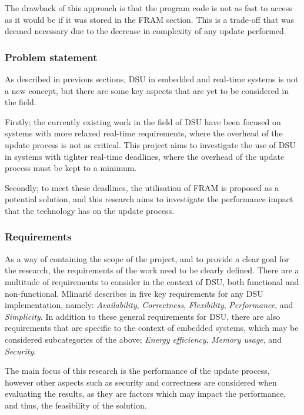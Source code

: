 The drawback of this approach is that the program code is not as fast to access as it would be if it was stored in the FRAM section. This is a trade-off that was deemed necessary due to the decrease in complexity of any update performed.  

\subsubsection*{Problem statement}
As described in previous sections, DSU in embedded and real-time systems is not a new concept, but there are some key aspects that are yet to be considered in the field. 

Firstly; the currently existing work in the field of DSU have been focused on systems with more relaxed real-time requirements, where the overhead of the update process is not as critical. This project aims to investigate the use of DSU in systems with tighter real-time deadlines, where the overhead of the update process must be kept to a minimum.

Secondly; to meet these deadlines, the utilisation of FRAM is proposed as a potential solution, and this research aims to investigate the performance impact that the technology has on the update process.  

\subsubsection*{Requirements}
As a way of containing the scope of the project, and to provide a clear goal for the research, the requirements of the work need to be clearly defined. There are a multitude of requirements to consider in the context of DSU, both functional and non-functional. Mlinarić describes in \cite{dsuChallenges} five key requirements for any DSU implementation, namely: \textit{Availability}, \textit{Correctness}, \textit{Flexibility}, \textit{Performance}, and \textit{Simplicity}. In addition to these general requirements for DSU, there are also requirements that are specific to the context of embedded systems, which may be considered subcategories of the above; \textit{Energy efficiency}, \textit{Memory usage}, and \textit{Security}.

The main focus of this research is the performance of the update process, however other aspects such as security and correctness are considered when evaluating the results, as they are factors which may impact the performance, and thus, the feasibility of the solution.
